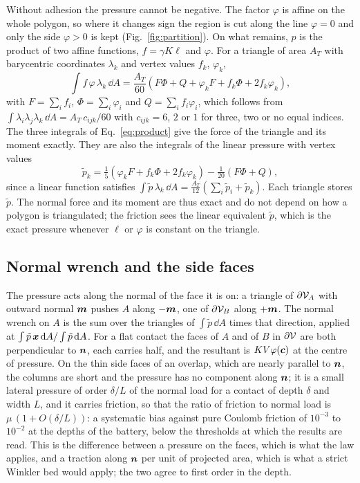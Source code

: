 Without adhesion the pressure cannot be negative. The factor $\varphi$ is affine on the whole
polygon, so where it changes sign the region is cut along the line $\varphi = 0$ and only the
side $\varphi > 0$ is kept (Fig.~\ref{fig:partition}). On what remains, $p$ is the product of
two affine functions, $f = \gamma K\ell$ and $\varphi$. For a triangle of area $A_T$ with
barycentric coordinates $\lambda_k$ and vertex values $f_k$, $\varphi_k$,
\begin{equation}
  \int f\,\varphi\,\lambda_k\,\dd A
  = \frac{A_T}{60}\left(F \Phi + Q + \varphi_k F + f_k \Phi + 2 f_k \varphi_k\right),
  \label{eq:product}
\end{equation}
with $F = \sum_i f_i$, $\Phi = \sum_i \varphi_i$ and $Q = \sum_i f_i \varphi_i$, which follows from
$\int \lambda_i\lambda_j\lambda_k\,\dd A = A_T\,c_{ijk}/60$ with $c_{ijk} = 6$,
$2$ or $1$ for three, two or no equal indices. The three integrals of Eq.~\eqref{eq:product}
give the force of the triangle and its moment exactly. They are also the integrals of the linear
pressure with vertex values
\begin{equation}
  \tilde p_k = \tfrac15\left(\varphi_k F + f_k \Phi + 2 f_k \varphi_k\right) - \tfrac1{20}\left(F \Phi + Q\right),
  \label{eq:equivalent}
\end{equation}
since a linear function satisfies
$\int \tilde p\,\lambda_k\,\dd A = \tfrac{A_T}{12}(\sum_i \tilde p_i + \tilde p_k)$. Each triangle
stores $\tilde p$. The normal force and its moment are thus exact and do not depend on how a
polygon is triangulated; the friction sees the linear equivalent $\tilde p$, which is the exact
pressure whenever $\ell$ or $\varphi$ is constant on the triangle.

\subsection{Normal wrench and the side faces}

The pressure acts along the normal of the face it is on: a triangle of $\partial\mathcal{V}_A$ with
outward normal $\boldsymbol{m}$ pushes $A$ along $-\boldsymbol{m}$, one of $\partial\mathcal{V}_B$ along $+\boldsymbol{m}$. The normal
wrench on $A$ is the sum over the triangles of $\int \tilde p\,\dd A$ times that direction,
applied at $\int \tilde p\,\boldsymbol{x}\,\mathrm{d} A / \int \tilde p\,\mathrm{d} A$. For a flat contact the faces of
$A$ and of $B$ in $\partial\mathcal{V}$ are both perpendicular to $\boldsymbol{n}$, each carries half, and the
resultant is $K V \varphi(\boldsymbol{c})$ at the centre of pressure. On the thin side faces of an
overlap, which are nearly parallel to $\boldsymbol{n}$, the columns are short and the pressure has no
component along $\boldsymbol{n}$; it is a small lateral pressure of order $\delta/L$ of the normal load for
a contact of depth $\delta$ and width $L$, and it carries friction, so that the ratio of
friction to normal load is $\mu\,(1 + O(\delta/L))$: a systematic bias against pure Coulomb
friction of $10^{-3}$ to $10^{-2}$ at the depths of the battery, below the thresholds at which
the results are read. This is the difference between a pressure on the faces, which is what the
law applies, and a traction along $\boldsymbol{n}$ per unit of projected area, which is what a strict
Winkler bed would apply; the two agree to first order in the depth.

